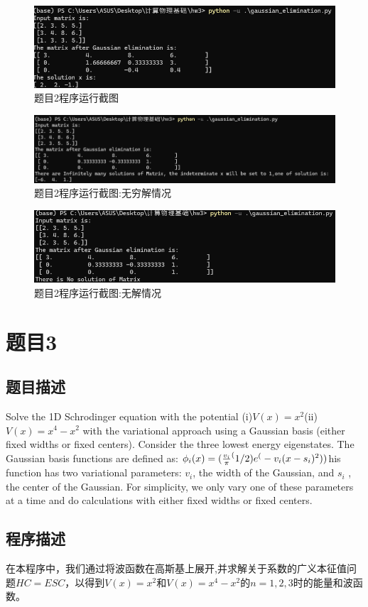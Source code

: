 \documentclass[11pt]{article}
\begin{document}
  \begin{figure}[ht]
    \centering
    \includegraphics[width=0.6\linewidth]{photo/fig1.png}
    \caption{题目2程序运行截图}
    \label{fig:1}
  \end{figure}
  \begin{figure}[ht]
    \centering
    \includegraphics[width=0.6\linewidth]{photo/fig2.png}
    \caption{题目2程序运行截图:无穷解情况}
    \label{fig:2}
  \end{figure}
  \begin{figure}[ht]
    \centering
    \includegraphics[width=0.6\linewidth]{photo/fig3.png}
    \caption{题目2程序运行截图:无解情况}
    \label{fig:3}
  \end{figure}

  \section{题目3}
  \subsection{题目描述}
  Solve the 1D Schrodinger equation with the potential (i)$V(x)=x^2 $(ii)
  $V(x)=x^4-x^2$ 
  with the variational approach using a Gaussian basis (either fixed widths or fixed centers). Consider the three lowest energy eigenstates.  The Gaussian basis functions are defined as: $\phi_i(x)=({v_i\over \pi}^(1/2)e^(-v_i(x-s_i)^2))$his function has two variational parameters:
$v_i$, the width of the Gaussian, and $s_i$
  , the center of the Gaussian. For simplicity, we only vary one of these parameters at a time and do calculations with either fixed widths or fixed centers. 


\subsection{程序描述}
在本程序中，我们通过将波函数在高斯基上展开,并求解关于系数的广义本征值问题$HC=ESC$，以得到$V(x)=x^2$和$V(x)=x^4-x^2$的$n=1,2,3$时的能量和波函数。
\end{document}
